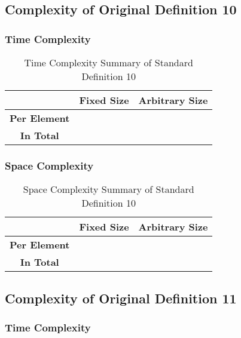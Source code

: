 \documentclass[conference]{IEEEtran}
\begin{document}
\subsection{Complexity of Original Definition 10}
\label{ca:p2_d10}

\subsubsection{Time Complexity}

\begin{table}[H]
    \centering
    \caption{Time Complexity Summary of Standard Definition 10}
    \begin{tabular}{|c|c|c|}
        \hline
        & \textbf{Fixed Size} & \textbf{Arbitrary Size} \\
        \hline
        \textbf{Per Element} &  &  \\
        \hline
        \textbf{In Total} &  &  \\
        \hline
    \end{tabular}
    \label{tab:time_p2_d10}
\end{table}

\subsubsection{Space Complexity}

\begin{table}[H]
    \centering
    \caption{Space Complexity Summary of Standard Definition 10}
    \begin{tabular}{|c|c|c|}
        \hline
        & \textbf{Fixed Size} & \textbf{Arbitrary Size} \\
        \hline
        \textbf{Per Element} &  &  \\
        \hline
        \textbf{In Total} &  &  \\
        \hline
    \end{tabular}
    \label{tab:space_p2_d10}
\end{table}

\subsection{Complexity of Original Definition 11}
\label{ca:p2_d11}

\subsubsection{Time Complexity}
\end{document}
